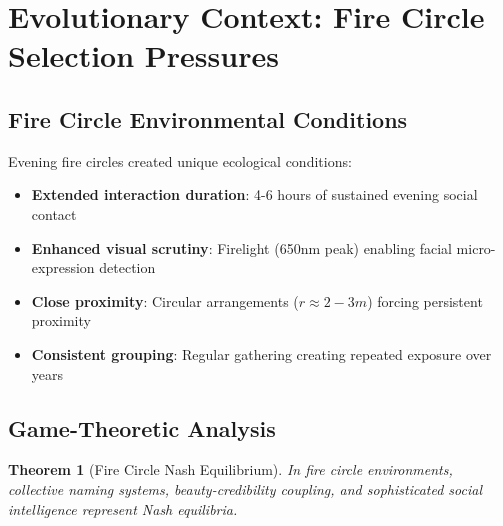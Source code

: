 \documentclass[12pt]{article}
\newtheorem{theorem}{Theorem}[section]
\theoremstyle{definition}
\theoremstyle{remark}
\begin{document}
\section{Evolutionary Context: Fire Circle Selection Pressures}
\label{sec:fire_circles}

\subsection{Fire Circle Environmental Conditions}

Evening fire circles created unique ecological conditions:

\begin{itemize}
\item \textbf{Extended interaction duration}: 4-6 hours of sustained evening social contact
\item \textbf{Enhanced visual scrutiny}: Firelight (650nm peak) enabling facial micro-expression detection
\item \textbf{Close proximity}: Circular arrangements ($r \approx 2-3m$) forcing persistent proximity
\item \textbf{Consistent grouping}: Regular gathering creating repeated exposure over years
\end{itemize}

\subsection{Game-Theoretic Analysis}

\begin{theorem}[Fire Circle Nash Equilibrium]
\label{thm:fire_circle_nash}
In fire circle environments, collective naming systems, beauty-credibility coupling, and sophisticated social intelligence represent Nash equilibria.
\end{theorem}
\end{document}
